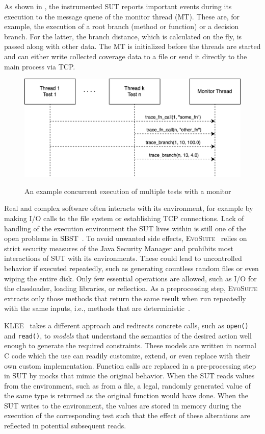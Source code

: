 \documentclass[paper=a4,%
  twoside,%
  BCOR4mm,%
  abstract=true,%
  toc=bibliography,%
  chapterprefix=true,%
  toc=bibliographynumbered,%
  open=right,%
  english,%
  pagesize=pdftex]{scrreprt}
\begin{document}
As shown in , the instrumented \ac{SUT} reports important events during its execution to the message queue of the monitor thread (MT). These are, for example, the execution of a root branch (method or function) or a decision branch. For the latter, the branch distance, which is calculated on the fly, is passed along with other data. The MT is initialized before the threads are started and can either write collected coverage data to a file or send it directly to the main process via \ac{TCP}.

\begin{figure}[h]
\caption{An example concurrent execution of multiple tests with a monitor}
\centering
\includegraphics[width=\textwidth]{test-execution}
\label{fig:test-execution}
\end{figure}

Real and complex software often interacts with its environment, for example by making I/O calls to the file system or establishing \ac{TCP} connections. Lack of handling of the execution environment the \ac{SUT} lives within is still one of the open problems in \ac{SBST}~\cite{McMinn2011}. To avoid unwanted side effects, \textsc{EvoSuite}~\cite{Fraser2013a} relies on strict security measures of the Java Security Manager and prohibits most interactions of \ac{SUT} with its environments. These could lead to uncontrolled behavior if executed repeatedly, such as generating countless random files or even wiping the entire disk. Only few essential operations are allowed, such as I/O for the classloader, loading libraries, or reflection. As a preprocessing step, \textsc{EvoSuite} extracts only those methods that return the same result when run repeatedly with the same inputs, i.e., methods that are deterministic~\cite{Fraser2012}.

\textsc{KLEE}~\cite{cadar2008klee} takes a different approach and redirects concrete calls, such as \texttt{open()} and \texttt{read()}, to \emph{models} that understand the semantics of the desired action well enough to generate the required constraints. These models are written in normal C code which the use can readily customize, extend, or even replace with their own custom implementation. Function calls are replaced in a pre-processing step in \ac{SUT} by mocks that mimic the original behavior. When the \ac{SUT} reads values from the environment, such as from a file, a legal, randomly generated value of the same type is returned as the original function would have done. When the \ac{SUT} writes to the environment, the values are stored in memory during the execution of the corresponding test such that the effect of these alterations are reflected in potential subsequent reads.
\end{document}
